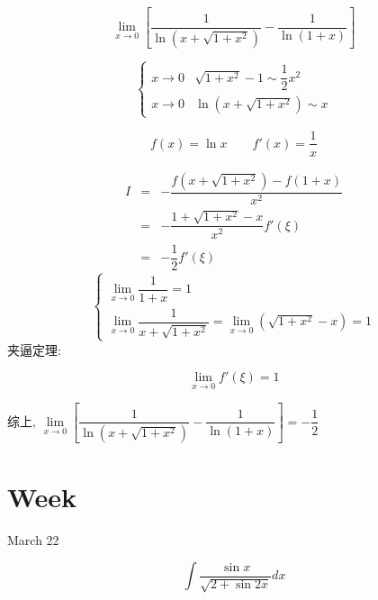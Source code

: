 \begin{example}[][Exam: 29.3.14]
	$$\lim\limits_{x\to 0}\left[ \dfrac{1}{\ln(x+\sqrt{1+x^2})}-\dfrac{1}{\ln(1+x)}\right]$$
\end{example}
\begin{solution}
	
	$$\begin{cases}
		x\to 0 & \sqrt{1+x^{2}}-1\sim \dfrac{1}{2}x^{2} \\
		x\to 0 & \ln(x+\sqrt{1+x^2}) \sim x
	\end{cases}$$

	
	$$f(x)=\ln x  \qquad f'(x) = \dfrac{1}{x}$$
	
	\begin{eqnarray*}
		I & = & -\dfrac{f(x+\sqrt{1+x^2})-f(1+x)}{x^{2}}\\
		  & = & -\dfrac{1+\sqrt{1+x^{2}}-x}{x^{2}}f'(\xi)\\
		  & = & -\dfrac{1}{2}f'(\xi)
	\end{eqnarray*} 
	$$\begin{cases}
	  \lim\limits_{x \to 0}\dfrac{1}{1+x} = 1\\
	  \lim\limits_{x \to 0}\dfrac{1}{x+\sqrt{1+x^{2}}} = \lim\limits_{x \to 0}(\sqrt{1+x^{2}}-x) = 1
	\end{cases}$$
	夹逼定理:

	$$\lim\limits_{x \to 0}f'(\xi) = 1$$
	
	综上, $\lim\limits_{x\to 0}\left[ \dfrac{1}{\ln(x+\sqrt{1+x^2})}-\dfrac{1}{\ln(1+x)}\right] =-\dfrac{1}{2}$
	
\end{solution}

\section{Week }

\textcolor{purplea}{March 22}

\begin{example}[][Exam: 29.4.1]
	$$\int\dfrac{\sin x}{\sqrt{2+\sin 2x}}dx$$
\end{example}

